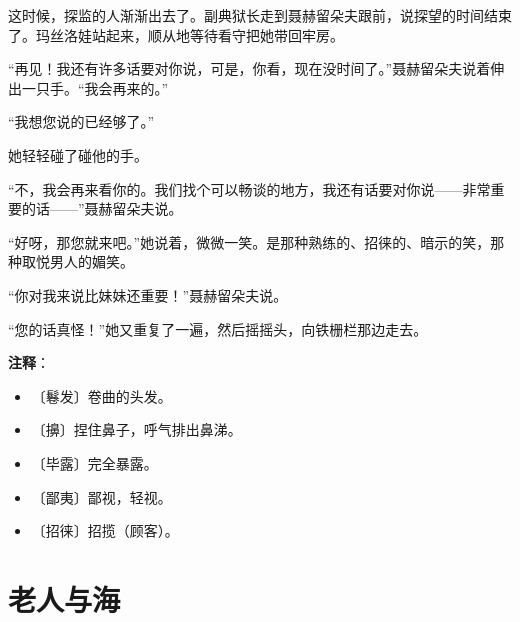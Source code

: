 \documentclass[12pt,UTF-8,openany]{ctexbook}
\begin{document}
\begin{normalsize}
    这时候，探监的人渐渐出去了。副典狱长走到聂赫留朵夫跟前，说探望的时间结束了。玛丝洛娃站起来，顺从地等待看守把她带回牢房。
    
    “再见！我还有许多话要对你说，可是，你看，现在没时间了。”聂赫留朵夫说着伸出一只手。“我会再来的。”
    
    “我想您说的已经够了。”
    
    她轻轻碰了碰他的手。
    
    “不，我会再来看你的。我们找个可以畅谈的地方，我还有话要对你说——非常重要的话——”聂赫留朵夫说。
    
    “好呀，那您就来吧。”她说着，微微一笑。是那种熟练的、招徕的、暗示的笑，那种取悦男人的媚笑。
    
    “你对我来说比妹妹还重要！”聂赫留朵夫说。
    
    “您的话真怪！”她又重复了一遍，然后摇摇头，向铁栅栏那边走去。
    
\end{normalsize}


\newpage

\textbf{注释}：

\vspace{-1em}

\begin{itemize}
    \setlength\itemsep{-0.2em}
    \item 〔鬈发〕卷曲的头发。
    \item 〔擤〕捏住鼻子，呼气排出鼻涕。
    \item 〔毕露〕完全暴露。
    \item 〔鄙夷〕鄙视，轻视。
    \item 〔招徕〕招揽（顾客）。
\end{itemize}

\chapter{老人与海}
\end{document}
